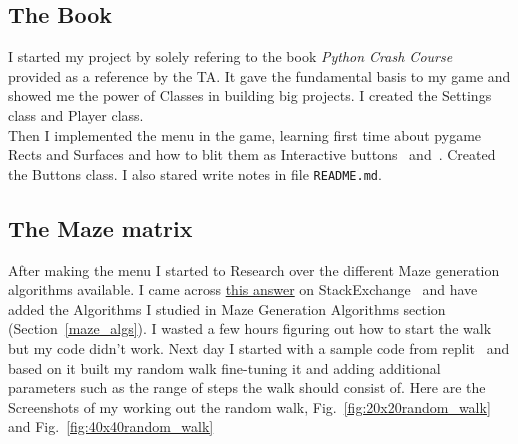 \documentclass{article}
\begin{document}
\subsection{The Book}
I started my project by solely refering to the book \textit{Python Crash Course}~\cite*{thebook} provided as a reference by the TA. It gave the fundamental basis to my game and showed me the power of Classes in building big projects. I created the Settings class and Player class.\\
Then I implemented the menu in the game, learning first time about pygame Rects and Surfaces and how to blit them as Interactive buttons~\cite{menu-geeksforgeeks} and~\cite{rendering_text}. Created the Buttons class. I also stared write notes in file \texttt{README.md}\cite{md-reference}.\\
\subsection{The Maze matrix}
After making the menu I started to Research over the different Maze generation algorithms available. I came across \href{https://stackoverflow.com/questions/38502/whats-a-good-algorithm-to-generate-a-maze}{this answer} on StackExchange~\cite*{stack-exchange-algorithms} and have added the Algorithms I studied in Maze Generation Algorithms section (Section~\ref{maze_algs}). I wasted a few hours figuring out how to start the walk but my code didn't work. Next day I started with a sample code from replit~\cite*{replit} and based on it built my random walk fine-tuning it and adding additional parameters such as the range of steps the walk should consist of. Here are the Screenshots of my working out the random walk, Fig.~\ref{fig:20x20random_walk} and Fig.~\ref{fig:40x40random_walk}\\
\end{document}
